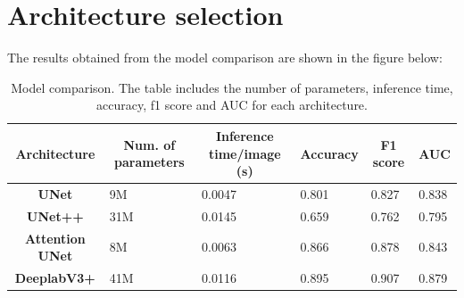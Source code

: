 \section{Architecture selection}
The results obtained from the model comparison are shown in the figure below: 
\begin{table}[H]

\begin{tabular}{|c|l|l|l|l|l|}
\hline
\textbf{Architecture}            & \multicolumn{1}{c|}{\textbf{Num. of parameters}} & \multicolumn{1}{c|}{\textbf{Inference time/image (s)}} & \multicolumn{1}{c|}{\textbf{Accuracy}} & \multicolumn{1}{c|}{\textbf{F1 score}} & \multicolumn{1}{c|}{\textbf{AUC}} \\ \hline
\textbf{UNet}           & 9M                                               & 0.0047                                                 & 0.801                                  & 0.827                                  & 0.838                             \\ \hline
\textbf{UNet++}         & 31M                                              & 0.0145                                                 & 0.659                                & 0.762                                  & 0.795                             \\ \hline
\textbf{Attention UNet} & 8M                                               & 0.0063                                                 & 0.866                                  & 0.878                                  & 0.843                             \\ \hline
\textbf{DeeplabV3+}     & 41M                                              & 0.0116                                                 & 0.895                                  & 0.907                                  & 0.879                             \\ \hline
\end{tabular}
\caption{Model comparison. The table includes the number of parameters, inference time, accuracy, f1 score and AUC for each architecture.}
\label{tab:my-table}
\end{table}


